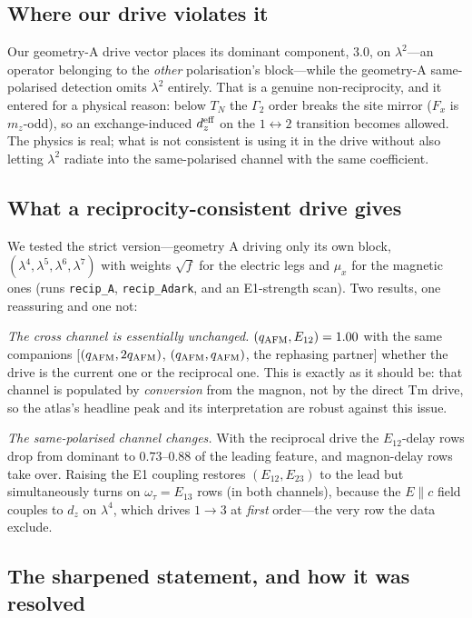 \documentclass[11pt]{article}
\newcommand{\qafm}{q_{\rm AFM}}
\begin{document}
\subsection{Where our drive violates it}

Our geometry-A drive vector places its dominant component, $3.0$, on
$\lambda^2$---an operator belonging to the \emph{other} polarisation's
block---while the geometry-A same-polarised detection omits $\lambda^2$
entirely.  That is a genuine non-reciprocity, and it entered for a
physical reason: below $T_N$ the $\Gamma_2$ order breaks the site
mirror ($F_x$ is $m_z$-odd), so an exchange-induced $d_z^{\rm eff}$ on
the $1\!\leftrightarrow\!2$ transition becomes allowed.  The physics is
real; what is not consistent is using it in the drive without also
letting $\lambda^2$ radiate into the same-polarised channel with the
same coefficient.

\subsection{What a reciprocity-consistent drive gives}

We tested the strict version---geometry A driving only its own block,
$(\lambda^4,\lambda^5,\lambda^6,\lambda^7)$ with weights
$\sqrt f$ for the electric legs and $\mu_{x}$ for the magnetic ones
(runs \texttt{recip\_A}, \texttt{recip\_Adark}, and an E1-strength
scan).  Two results, one reassuring and one not:

\emph{The cross channel is essentially unchanged.}
$(\qafm,E_{12})=1.00$ with the same companions
[$(\qafm,2\qafm)$, $(\qafm,\qafm)$, the rephasing partner] whether the
drive is the current one or the reciprocal one.  This is exactly as it
should be: that channel is populated by \emph{conversion} from the
magnon, not by the direct Tm drive, so the atlas's headline peak and
its interpretation are robust against this issue.

\emph{The same-polarised channel changes.}  With the reciprocal drive
the $E_{12}$-delay rows drop from dominant to $0.73$--$0.88$ of the
leading feature, and magnon-delay rows take over.  Raising the E1
coupling restores $(E_{12},E_{23})$ to the lead but simultaneously
turns on $\omega_\tau=E_{13}$ rows (in both channels), because the
$E\!\parallel\!c$ field couples to $d_z$ on $\lambda^4$, which drives
$1\!\to\!3$ at \emph{first} order---the very row the data exclude.

\subsection{The sharpened statement, and how it was resolved}
\end{document}
